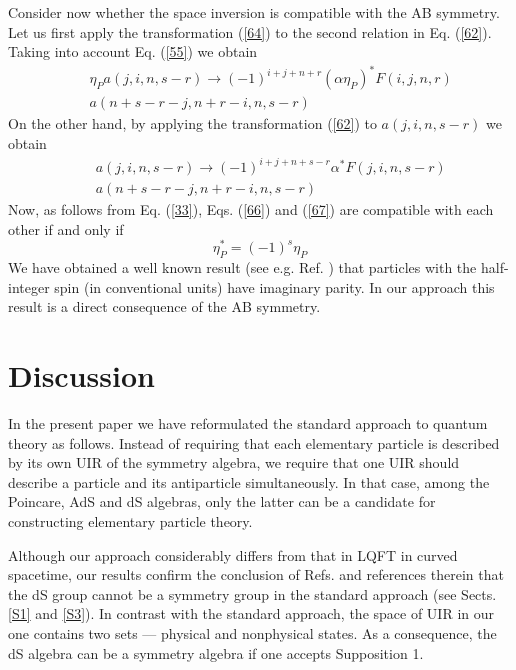 \documentclass[a4paper,12pt]{article}%
\begin{document}
Consider now whether the space inversion is 
compatible with the AB symmetry. Let us first
apply the transformation (\ref{64}) to the
second relation in Eq. (\ref{62}). Taking into
account Eq. (\ref{55}) we obtain
\begin{eqnarray}
&&\eta_Pa(j,i,n,s-r)\rightarrow (-1)^{i+j+n+r}
(\alpha\eta_P)^*F(i,j,n,r)\nonumber\\
&&a(n+s-r-j,n+r-i,n,s-r)
\label{66}
\end{eqnarray}
On the other hand, by applying the transformation
(\ref{62}) to $a(j,i,n,s-r)$ we obtain
\begin{eqnarray}
&&a(j,i,n,s-r)\rightarrow (-1)^{i+j+n+s-r}
\alpha^*F(j,i,n,s-r)\nonumber\\
&&a(n+s-r-j,n+r-i,n,s-r)
\label{67}
\end{eqnarray}
Now, as follows from Eq. (\ref{33}), Eqs. (\ref{66})
and (\ref{67}) are compatible with each other if and
only if
\begin{equation}
\eta_P^* =(-1)^s \eta_P
\label{68}
\end{equation}
We have obtained a well known result (see e.g. Ref.
\cite{Wein-super}) that particles with the 
half-integer spin (in conventional units) have
imaginary parity. In our approach this result is
a direct consequence of the AB symmetry.

\section{Discussion}
\label{S9}

In the present paper we have reformulated the 
standard approach
to quantum theory as follows. Instead of requiring that
each elementary particle is described by its own UIR of
the symmetry algebra, we require that one UIR should 
describe a particle and its antiparticle simultaneously.
In that case, among the Poincare, AdS and dS algebras,
only the latter can be a candidate for constructing
elementary particle theory. 

\begin{sloppypar}
Although our approach considerably differs from that
in LQFT in curved spacetime, our results confirm the 
conclusion of Refs. \cite{Narlikar,Susskind} and references
therein that the dS group cannot be a symmetry group
in the standard approach (see Sects. \ref{S1} and 
\ref{S3}). In contrast with the standard approach, 
the space of UIR
in our one contains two sets --- physical and 
nonphysical states. As a consequence, the dS algebra
can be a symmetry algebra if one accepts Supposition 1. 
\end{sloppypar}
\end{document}
